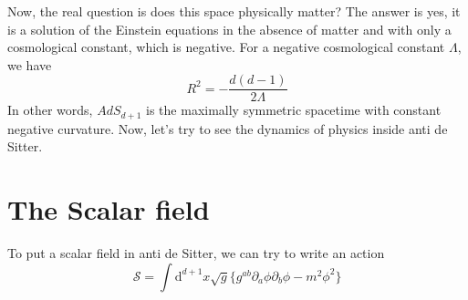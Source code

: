 \documentclass[a4paper]{book}
\theoremstyle{definition}
\theoremstyle{remark}
\begin{document}
Now, the real question is does this space physically matter? The answer is yes, it is a solution of the Einstein equations in the absence of matter and with only a cosmological constant, which is negative. For a negative cosmological constant $\Lambda$, we have 
\begin{equation}
    R^2 = -\frac{d(d-1)}{2\Lambda}
\end{equation} 
In other words, $AdS_{d+1}$ is the maximally symmetric spacetime with constant negative curvature. Now, let's try to see the dynamics of physics inside anti de Sitter. 

\section{The Scalar field}

To put a scalar field in anti de Sitter, we can try to write an action 
\begin{equation}
    \mathcal S = \int \text{d}^{d+1}x \sqrt{g} \{g^{ab} \partial_a \phi \partial_b \phi - m^2 \phi^2\} 
\end{equation}
\end{document}
